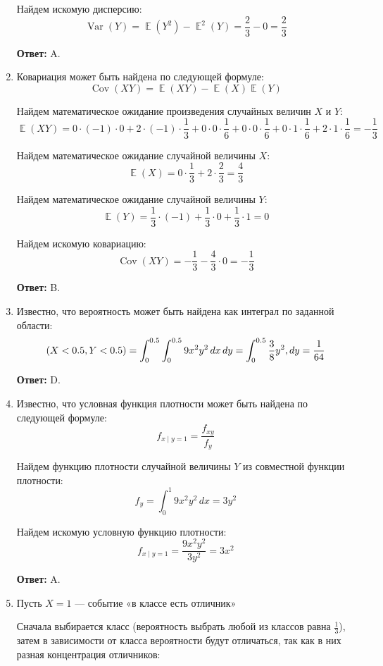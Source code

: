 \documentclass[a4paper]{article} %
\DeclareMathOperator{\Var}{Var}
\DeclareMathOperator{\Cov}{Cov}
\DeclareMathOperator{\E}{\mathbb{E}}
\let\P\relax
\DeclareMathOperator{\P}{\mathbb{P}}
\begin{document}
\begin{enumerate}
    Найдем искомую дисперсию:
    \[
    \Var(Y) = \E(Y^2) - \E^2(Y) = \frac{2}{3} - 0 = \frac{2}{3}
    \]
    
    \textbf{Ответ:} A.
    
    
    \item
    Ковариация может быть найдена по следующей формуле:
    \[
    \Cov(XY) = \E(XY) - \E(X)\E(Y)
    \]
    
    Найдем математическое ожидание произведения случайных величин $X$ и $Y$:
    \[
    \E(XY) = 0\cdot(-1)\cdot0 + 2\cdot(-1)\cdot\frac{1}{3} + 0\cdot0\cdot\frac{1}{6} + 0\cdot0\cdot\frac{1}{6} + 0\cdot1\cdot\frac{1}{6} + 2\cdot1\cdot\frac{1}{6} = -\frac{1}{3}
    \]
    
    Найдем математическое ожидание случайной величины $X$:
    \[
    \E(X) = 0\cdot\frac{1}{3} + 2\cdot\frac{2}{3} = \frac{4}{3}
    \]
    
    Найдем математическое ожидание случайной величины $Y$:
    \[
    \E(Y) = \frac{1}{3} \cdot (-1) + \frac{1}{3} \cdot 0 + \frac{1}{3} \cdot 1 = 0
    \]
    
    Найдем искомую ковариацию:
    \[
    \Cov(XY) = -\frac{1}{3} - \frac{4}{3}\cdot0 = -\frac{1}{3}
    \]
    
    \textbf{Ответ:} B.
    
    
    \item
    Известно, что вероятность может быть найдена как интеграл по заданной области:
    \[
    \P(X<0.5, Y<0.5) = \int_{0}^{0.5}\int_{0}^{0.5} 9x^2y^2 \,dx\,dy = \int_{0}^{0.5} \frac{3}{8}y^2 ,dy = \frac{1}{64}
    \]
    
    \textbf{Ответ:} D.
    
    
    \item
    Известно, что условная функция плотности может быть найдена по следующей формуле:
    \[
    f_{x\mid y=1} = \frac{f_{xy}}{f_{y}}
    \]
    
    Найдем функцию плотности случайной величины $Y$ из совместной функции плотности:
    \[
    f_{y} = \int_{0}^{1} 9x^2y^2 \,dx = 3y^2
    \]
    
    Найдем искомую условную функцию плотности:
    \[
    f_{x\mid y=1} = \frac{9x^2y^2}{3y^2} = 3x^2
    \]
    
    \textbf{Ответ:} A.
    
    
    \item
    Пусть $X=1$ — событие «в классе есть отличник»
    
    Сначала выбирается класс (вероятность выбрать любой из классов равна $\frac{1}{3}$), затем в зависимости от класса вероятности будут отличаться, так как в них разная концентрация отличников:
    

\end{enumerate}
\end{document}
